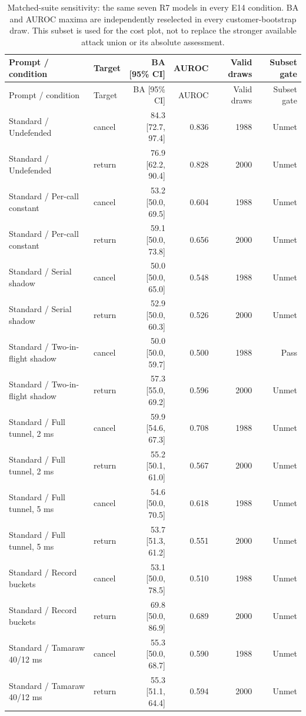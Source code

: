 \begin{longtable}{@{}llrrrr@{}}
\caption{Matched-suite sensitivity: the same seven R7 models in every E14 condition. BA and AUROC maxima are independently reselected in every customer-bootstrap draw. This subset is used for the cost plot, not to replace the stronger available attack union or its absolute assessment.}\label{tab:r7-common}\\
\toprule Prompt / condition & Target & BA [95\% CI] & AUROC & Valid draws & Subset gate\\\midrule\endfirsthead
\toprule Prompt / condition & Target & BA [95\% CI] & AUROC & Valid draws & Subset gate\\\midrule\endhead
Standard / Undefended & cancel & 84.3 [72.7, 97.4] & 0.836 & 1988 & Unmet\\
Standard / Undefended & return & 76.9 [62.2, 90.4] & 0.828 & 2000 & Unmet\\
Standard / Per-call constant & cancel & 53.2 [50.0, 69.5] & 0.604 & 1988 & Unmet\\
Standard / Per-call constant & return & 59.1 [50.0, 73.8] & 0.656 & 2000 & Unmet\\
Standard / Serial shadow & cancel & 50.0 [50.0, 65.0] & 0.548 & 1988 & Unmet\\
Standard / Serial shadow & return & 52.9 [50.0, 60.3] & 0.526 & 2000 & Unmet\\
Standard / Two-in-flight shadow & cancel & 50.0 [50.0, 59.7] & 0.500 & 1988 & Pass\\
Standard / Two-in-flight shadow & return & 57.3 [55.0, 69.2] & 0.596 & 2000 & Unmet\\
Standard / Full tunnel, 2 ms & cancel & 59.9 [54.6, 67.3] & 0.708 & 1988 & Unmet\\
Standard / Full tunnel, 2 ms & return & 55.2 [50.1, 61.0] & 0.567 & 2000 & Unmet\\
Standard / Full tunnel, 5 ms & cancel & 54.6 [50.0, 70.5] & 0.618 & 1988 & Unmet\\
Standard / Full tunnel, 5 ms & return & 53.7 [51.3, 61.2] & 0.551 & 2000 & Unmet\\
Standard / Record buckets & cancel & 53.1 [50.0, 78.5] & 0.510 & 1988 & Unmet\\
Standard / Record buckets & return & 69.8 [50.0, 86.9] & 0.689 & 2000 & Unmet\\
Standard / Tamaraw 40/12 ms & cancel & 55.3 [50.0, 68.7] & 0.590 & 1988 & Unmet\\
Standard / Tamaraw 40/12 ms & return & 55.3 [51.1, 64.4] & 0.594 & 2000 & Unmet\\

\end{longtable}
